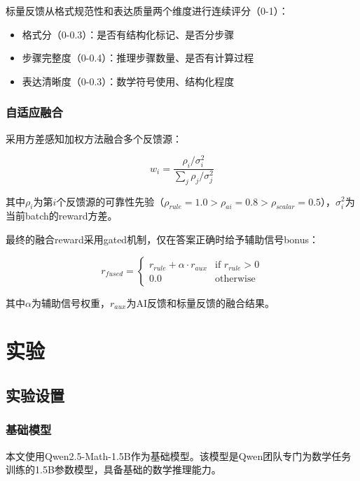 \documentclass[10.5pt]{article}
\begin{document}
标量反馈从格式规范性和表达质量两个维度进行连续评分（0-1）：

\begin{itemize}[leftmargin=2em]
  \item 格式分（0-0.3）：是否有结构化标记、是否分步骤
  \item 步骤完整度（0-0.4）：推理步骤数量、是否有计算过程
  \item 表达清晰度（0-0.3）：数学符号使用、结构化程度
\end{itemize}

\subsubsection{自适应融合}

采用方差感知加权方法\cite{mogrpo}融合多个反馈源：

\begin{equation}
w_i = \frac{\rho_i / \sigma_i^2}{\sum_j \rho_j / \sigma_j^2}
\end{equation}

其中$\rho_i$为第$i$个反馈源的可靠性先验（$\rho_{rule}=1.0 > \rho_{ai}=0.8 > \rho_{scalar}=0.5$），$\sigma_i^2$为当前batch的reward方差。

最终的融合reward采用gated机制，仅在答案正确时给予辅助信号bonus：

\begin{equation}
r_{fused} = \begin{cases} r_{rule} + \alpha \cdot r_{aux} & \text{if } r_{rule} > 0 \\ 0.0 & \text{otherwise} \end{cases}
\end{equation}

其中$\alpha$为辅助信号权重，$r_{aux}$为AI反馈和标量反馈的融合结果。

\section{实验}

\subsection{实验设置}

\subsubsection{基础模型}

本文使用Qwen2.5-Math-1.5B\cite{qwen25math}作为基础模型。该模型是Qwen团队专门为数学任务训练的1.5B参数模型，具备基础的数学推理能力。
\end{document}
